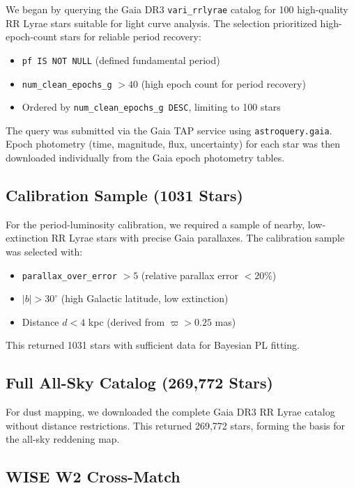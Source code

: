 \documentclass[10pt,preprint2]{aastex}
\begin{document}
We began by querying the Gaia DR3 \texttt{vari\_rrlyrae} catalog for 100 high-quality RR Lyrae stars suitable for light curve analysis. The selection prioritized high-epoch-count stars for reliable period recovery:
\begin{itemize}
  \item \texttt{pf IS NOT NULL} (defined fundamental period)
  \item \texttt{num\_clean\_epochs\_g} $> 40$ (high epoch count for period recovery)
  \item Ordered by \texttt{num\_clean\_epochs\_g DESC}, limiting to 100 stars
\end{itemize}
The query was submitted via the Gaia TAP service using \texttt{astroquery.gaia}. Epoch photometry (time, magnitude, flux, uncertainty) for each star was then downloaded individually from the Gaia epoch photometry tables.

\subsection{Calibration Sample (1031 Stars)}

For the period-luminosity calibration, we required a sample of nearby, low-extinction RR Lyrae stars with precise Gaia parallaxes. The calibration sample was selected with:
\begin{itemize}
  \item \texttt{parallax\_over\_error} $> 5$ (relative parallax error $< 20\%$)
  \item $|b| > 30^\circ$ (high Galactic latitude, low extinction)
  \item Distance $d < 4$ kpc (derived from $\varpi > 0.25$ mas)
\end{itemize}
This returned 1031 stars with sufficient data for Bayesian PL fitting.

\subsection{Full All-Sky Catalog (269,772 Stars)}

For dust mapping, we downloaded the complete Gaia DR3 RR Lyrae catalog without distance restrictions. This returned 269,772 stars, forming the basis for the all-sky reddening map.

\subsection{WISE W2 Cross-Match}
\end{document}
